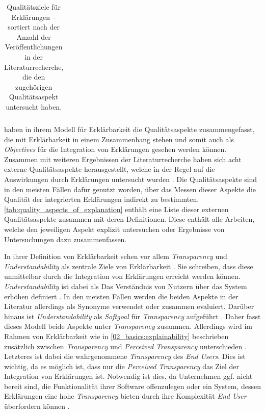 \begin{table}[b!]
\begin{center}
\begin{tabular}{p{}p{}p{}}
            \toprule
        \end{tabular}
    \end{center}
    \caption{Qualitätsziele für Erklärungen – sortiert nach der Anzahl der Veröffentlichungen in der Literaturrecherche, die den zugehörigen Qualitätsaspekt untersucht haben.}
    \label{tab:quality_aspects_of_explanation}
\end{table}

\citeauthor{chazette_knowledge_nodate} haben in ihrem Modell für Erklärbarkeit die Qualitätsaspekte zusammengefasst, die mit Erklärbarkeit in einem Zusammenhang stehen und somit auch als \textit{Objectives} für die Integration von Erklärungen gesehen werden können. Zusammen mit weiteren Ergebnissen der Literaturrecherche haben sich acht externe Qualitätsaspekte herausgestellt, welche in der Regel auf die Auswirkungen durch Erklärungen untersucht wurden \cite{nunes_systematic_2017, tintarev2007survey}. Die Qualitätsaspekte sind in den meisten Fällen dafür genutzt worden, über das Messen dieser Aspekte die Qualität der integrierten Erklärungen indirekt zu bestimmten. \autoref{tab:quality_aspects_of_explanation} enthält eine Liste dieser externen Qualitätsaspekte zusammen mit deren Definitionen. Diese enthält alle Arbeiten, welche den jeweiligen Aspekt explizit untersuchen oder Ergebnisse von Untersuchungen dazu zusammenfassen.

In ihrer Definition von Erklärbarkeit sehen \citeauthor{chazette_knowledge_nodate} vor allem \textit{Transparency} und \textit{Understandability} als zentrale Ziele von Erklärbarkeit \cite{chazette_end-users_nodate}. Sie schreiben, dass diese unmittelbar durch die Integration von Erklärungen erreicht werden können. \textit{Understandability} ist dabei als \glqq Das Verständnis von Nutzern über das System erhöhen\grqq{} definiert \cite[vgl.][]{chazette_end-users_nodate}. In den meisten Fällen werden die beiden Aspekte in der Literatur allerdings als Synonyme verwendet \cite{nunes_systematic_2017, carvalho2017quality,tintarev_designing_nodate} oder zusammen evaluiert. Darüber hinaus ist \textit{Understandability} als \textit{Softgoal} für \textit{Transparency} aufgeführt \cite{do2010software}. Daher fasst dieses Modell beide Aspekte unter \textit{Transparency} zusammen. Allerdings wird im Rahmen von Erklärbarkeit wie in \autoref{02_basics:explainability} beschrieben zusätzlich zwischen \textit{Transparency} und \textit{Perceived Transparency} unterschieden \cite{nunes_systematic_2017}. Letzteres ist dabei die wahrgenommene \textit{Transparency} des \textit{End Users}. Dies ist wichtig, da es möglich ist, dass nur die \textit{Perceived Transparency} das Ziel der Integration von Erklärungen ist. Notwendig ist dies, da Unternehmen ggf. nicht bereit sind, die Funktionalität ihrer Software offenzulegen oder ein System, dessen Erklärungen eine hohe \textit{Transparency} bieten durch ihre Komplexität \textit{End User} überfordern können \cite{chazette_knowledge_nodate}.

